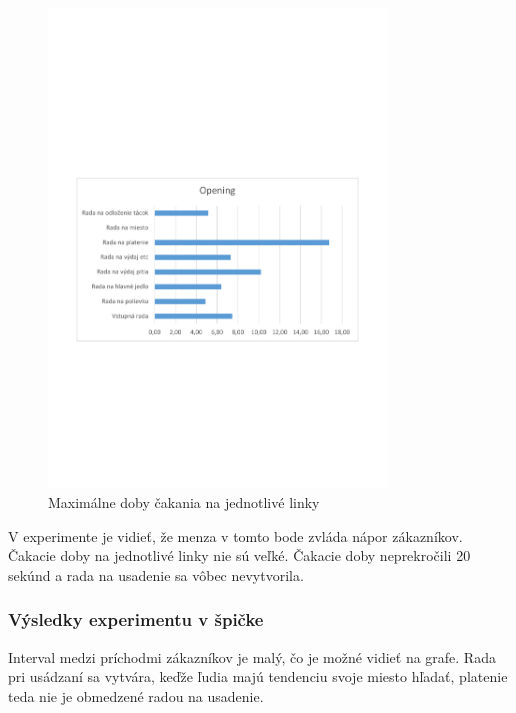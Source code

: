 \documentclass{article}
\begin{document}
\begin{figure}[h!]
  \centering
  \includegraphics[width=0.8\textwidth,keepaspectratio]{experiment_1.pdf}
  \caption{Maximálne doby čakania na jednotlivé linky}
  \label{fig:experiment_1}
\end{figure}

V experimente je vidieť, že menza v tomto bode zvláda nápor zákazníkov. Čakacie doby na jednotlivé linky nie sú veľké. Čakacie doby neprekročili 20 sekúnd a rada na usadenie sa vôbec nevytvorila.

\pagebreak
\subsubsection{Výsledky experimentu v špičke}
Interval medzi príchodmi zákazníkov je malý, čo je možné vidieť na grafe. Rada pri usádzaní sa vytvára, keďže ľudia majú tendenciu svoje miesto hľadať, platenie teda nie je obmedzené radou na usadenie.
\end{document}
